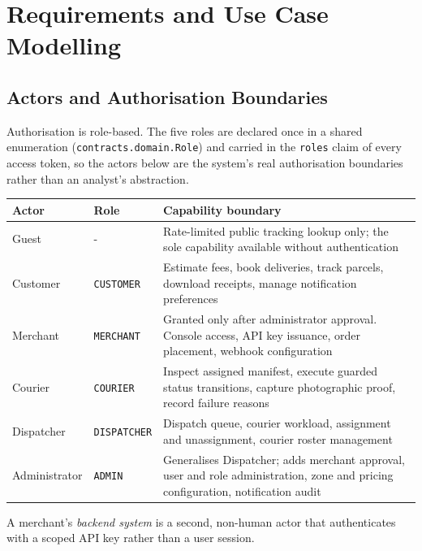 \documentclass[11pt,a4paper,oneside,openany]{report}
\newcommand{\code}[1]{\texttt{\small #1}}
\begin{document}
\chapter{Requirements and Use Case Modelling}

\section{Actors and Authorisation Boundaries}
Authorisation is role-based. The five roles are declared once in a shared enumeration
(\code{contracts.domain.Role}) and carried in the \code{roles} claim of every access token, so the
actors below are the system's real authorisation boundaries rather than an analyst's abstraction.

\begin{center}
\small
\begin{tabular}{@{}llp{8.4cm}@{}}
\toprule
\textbf{Actor} & \textbf{Role} & \textbf{Capability boundary} \\
\midrule
Guest       & -           & Rate-limited public tracking lookup only; the sole capability
available without authentication \\
\addlinespace
Customer    & \code{CUSTOMER}   & Estimate fees, book deliveries, track parcels, download
receipts, manage notification preferences \\
\addlinespace
Merchant    & \code{MERCHANT}   & Granted only after administrator approval. Console access, API
key issuance, order placement, webhook configuration \\
\addlinespace
Courier     & \code{COURIER}    & Inspect assigned manifest, execute guarded status transitions,
capture photographic proof, record failure reasons \\
\addlinespace
Dispatcher  & \code{DISPATCHER} & Dispatch queue, courier workload, assignment and unassignment,
courier roster management \\
\addlinespace
Administrator & \code{ADMIN}    & Generalises Dispatcher; adds merchant approval, user and role
administration, zone and pricing configuration, notification audit \\
\bottomrule
\end{tabular}
\label{tab:actors}
\end{center}

A merchant's \emph{backend system} is a second, non-human actor that authenticates with a scoped
API key rather than a user session.
\end{document}
